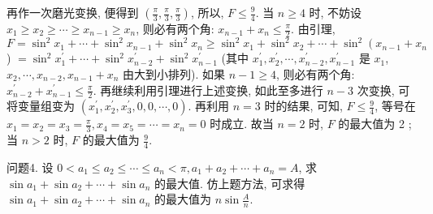 再作一次磨光变换, 便得到 $\left(\frac{\pi}{3}, \frac{\pi}{3}, \frac{\pi}{3}\right)$, 所以, $F \leqslant \frac{9}{4}$. 当 $n \geqslant 4$ 时, 不妨设 $x_1 \geqslant x_2 \geqslant \cdots \geqslant x_{n-1} \geqslant x_n$, 则必有两个角: $x_{n-1}+x_n \leqslant \frac{\pi}{2}$. 由引理, $F=\sin ^2 x_1+\cdots+\sin ^2 x_{n-1}+\sin ^2 x_n \geqslant \sin ^2 x_1+\sin ^2 x_2+\cdots+\sin ^2\left(x_{n-1}+\right. x_n$ ) $=\sin ^2 x_1^{\prime}+\cdots+\sin ^2 x_{n-2}^{\prime}+\sin ^2 x_{n-1}^{\prime}$ (其中 $x_1^{\prime}, x_2^{\prime}, \cdots, x_{n-2}^{\prime}, x_{n-1}^{\prime}$ 是 $x_1$, $x_2, \cdots, x_{n-2}, x_{n-1}+x_n$ 由大到小排列). 如果 $n-1 \geqslant 4$, 则必有两个角: $x_{n-2}^{\prime}+ x_{n-1}^{\prime} \leqslant \frac{\pi}{2}$. 再继续利用引理进行上述变换, 如此至多进行 $n-3$ 次变换, 可将变量组变为 $\left(x_1^{\prime}, x_2^{\prime}, x_3^{\prime}, 0,0, \cdots, 0\right)$. 再利用 $n=3$ 时的结果, 可知, $F \leqslant \frac{9}{4}$, 等号在 $x_1=x_2=x_3=\frac{\pi}{3}, x_4=x_5=\cdots=x_n=0$ 时成立.
故当 $n=2$ 时, $F$ 的最大值为 2 ; 当 $n>2$ 时, $F$ 的最大值为 $\frac{9}{4}$.



问题4. 设 $0<a_1 \leqslant a_2 \leqslant \cdots \leqslant a_n<\pi, a_1+a_2+\cdots+a_n=A$, 求 $\sin a_1+ \sin a_2+\cdots+\sin a_n$ 的最大值.
仿上题方法, 可求得 $\sin a_1+\sin a_2+\cdots+\sin a_n$ 的最大值为 $n \sin \frac{A}{n}$.



